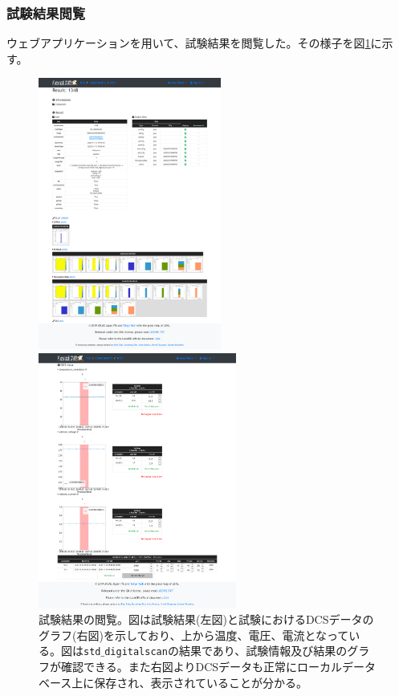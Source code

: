 \subsubsection{試験結果閲覧}
ウェブアプリケーションを用いて、試験結果を閲覧した。その様子を図\ref{demo_view_result}に示す。
\begin{figure}[bpt]\centering
  \begin{minipage}{0.4\hsize}
    \begin{center}
    \includegraphics[width=60mm]{demo_view_scan_result}
    \end{center}
  \end{minipage}
  \begin{minipage}{0.4\hsize}
    \begin{center}
    \includegraphics[width=65mm]{demo_view_dcs}
    \end{center}
  \end{minipage}
  \caption[試験結果の閲覧]{試験結果の閲覧。図は試験結果(左図)と試験におけるDCSデータのグラフ(右図)を示しており、上から温度、電圧、電流となっている。図は\texttt{std$\_$digitalscan}の結果であり、試験情報及び結果のグラフが確認できる。また右図よりDCSデータも正常にローカルデータベース上に保存され、表示されていることが分かる。}
  \label{demo_view_result}
\end{figure}


